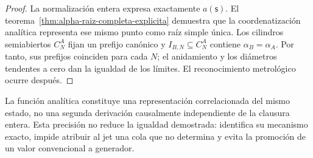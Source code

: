 \begin{proof}
La normalización entera expresa exactamente \(a(\mathsf s)\). El
teorema~\ref{thm:alpha-raiz-completa-explicita} demuestra que la coordenatización
analítica representa ese mismo punto como raíz simple única. Los
cilindros semiabiertos \(C_N^A\) fijan un prefijo canónico y
\(I_{B,N}\subseteq C_N^A\) contiene \(\alpha_B=\alpha_A\). Por tanto, sus
prefijos coinciden para cada \(N\); el anidamiento y los diámetros tendentes a
cero dan la igualdad de los límites. El reconocimiento
metrológico ocurre después.
\end{proof}

La función analítica constituye una representación correlacionada del mismo
estado, no una segunda derivación causalmente independiente de la clausura
entera. Esta precisión no reduce la igualdad demostrada: identifica su
mecanismo exacto, impide atribuir al jet una cola que no determina y evita la
promoción de un valor convencional a generador.
